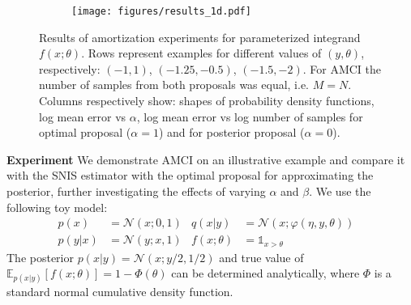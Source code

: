 \documentclass[12pt]{article}
\begin{document}
\begin{figure}[t]
  \centering
	\begin{subfigure}[b]{0.9\textwidth}
		\centering
		\texttt{[image: figures/results\_1d.pdf]}
		\captionsetup{justification=centering}
		
	\end{subfigure}
	\caption{
		Results of amortization experiments for parameterized integrand $f(x; \theta)$.
		Rows represent examples for different values of $(y, \theta)$, respectively: $(-1, 1)$, $(-1.25, -0.5)$, $(-1.5, -2)$.
		For AMCI the number of samples from both proposals was equal, i.e. $M=N$.
		Columns respectively show: shapes of probability density functions, log mean error vs $\alpha$, 
		log mean error vs log number of samples for optimal proposal ($\alpha = 1$) and for posterior proposal ($\alpha = 0$). \vspace{-12pt}
	}
	\label{fig:results_1d}
\end{figure}

 \textbf{Experiment} \quad We demonstrate AMCI on an illustrative example
 and compare it with the SNIS estimator
 with the optimal proposal for approximating the posterior, further
 investigating the effects of varying $\alpha$ and $\beta$.
We use the following toy model:
\vspace{-20pt}
\begin{align*}
p(x) &= \mathcal{N}(x; 0, 1) &
q(x|y) &= \mathcal{N}\left(x; \varphi(\eta, y, \theta) \right) \\
p(y|x) &= \mathcal{N}(y; x, 1) &
f(x; \theta) &= \mathds{1}_{x>\theta} &
\end{align*} 
The posterior {$p(x|y) = \mathcal{N}(x; y/2, 1/2)$} and true value of
$\mathbb{E}_{p(x|y)} \left[ f(x; \theta) \right] = 1-\Phi(\theta)$ can be determined analytically, where $\Phi$ is a standard normal cumulative density function.
\end{document}
